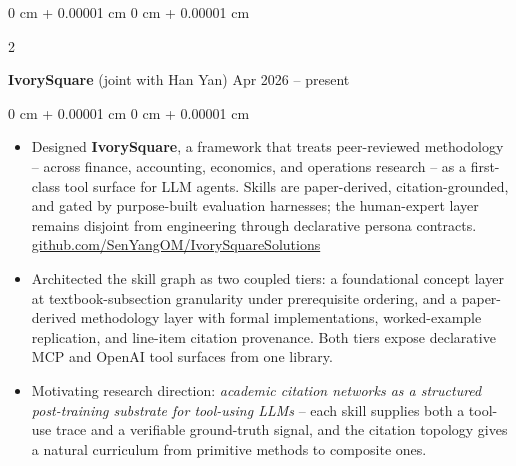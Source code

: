 \documentclass[10pt, letterpaper]{article}
\newenvironment{highlights}{
    \begin{itemize}[
        topsep=0.10 cm,
        parsep=0.10 cm,
        partopsep=0pt,
        itemsep=0pt,
        leftmargin=0 cm + 10pt
    ]
}{
    \end{itemize}
} %
\newenvironment{onecolentry}{
    \begin{adjustwidth}{
        0 cm + 0.00001 cm
    }{
        0 cm + 0.00001 cm
    }
}{
    \end{adjustwidth}
} %
\newenvironment{twocolentry}[2][]{
    \onecolentry
    \def\secondColumn{#2}
    \setcolumnwidth{\fill, 4.5 cm}
    \begin{paracol}{2}
}{
    \switchcolumn \raggedleft \secondColumn
    \end{paracol}
    \endonecolentry
} %
\begin{document}
        \vspace{0.2 cm}

        \begin{twocolentry}{
            Apr 2026 – present
        }
            \textbf{IvorySquare} (joint with Han Yan)\end{twocolentry}

        \vspace{0.10 cm}
        \begin{onecolentry}
            \begin{highlights}
                \item Designed \textbf{IvorySquare}, a framework that treats peer-reviewed methodology -- across finance, accounting, economics, and operations research -- as a first-class tool surface for LLM agents. Skills are paper-derived, citation-grounded, and gated by purpose-built evaluation harnesses; the human-expert layer remains disjoint from engineering through declarative persona contracts. \href{https://github.com/SenYangOM/IvorySquareSolutions}{github.com/SenYangOM/IvorySquareSolutions}
                \item Architected the skill graph as two coupled tiers: a foundational concept layer at textbook-subsection granularity under prerequisite ordering, and a paper-derived methodology layer with formal implementations, worked-example replication, and line-item citation provenance. Both tiers expose declarative MCP and OpenAI tool surfaces from one library.
                \item Motivating research direction: \textit{academic citation networks as a structured post-training substrate for tool-using LLMs} -- each skill supplies both a tool-use trace and a verifiable ground-truth signal, and the citation topology gives a natural curriculum from primitive methods to composite ones.
            \end{highlights}
        \end{onecolentry}




\end{document}
